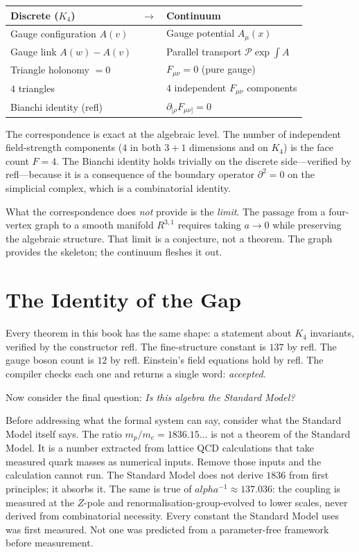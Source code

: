 \documentclass[11pt,a4paper]{book}
\def\alpha{alpha}%
\def\mathbb#1{#1}%
\def\texttt#1{#1}%
\begin{document}
\begin{center}
\begin{tabular}{lcl}
\toprule
Discrete ($K_4$) & $\longrightarrow$ & Continuum \\
\midrule
Gauge configuration $A(v)$ & & Gauge potential $A_\mu(x)$ \\
Gauge link $A(w) - A(v)$ & & Parallel transport $\mathcal{P}\exp\!\int A$ \\
Triangle holonomy $= 0$ & & $F_{\mu\nu} = 0$ (pure gauge) \\
$4$ triangles & & $4$ independent $F_{\mu\nu}$ components \\
Bianchi identity (\texttt{refl}) & & $\partial_{[\rho} F_{\mu\nu]} = 0$ \\
\bottomrule
\end{tabular}
\end{center}

The correspondence is exact at the algebraic level. The number of independent field-strength components ($4$ in both $3+1$ dimensions and on $K_4$) is the face count $F = 4$. The Bianchi identity holds trivially on the discrete side---verified by \texttt{refl}---because it is a consequence of the boundary operator $\partial^2 = 0$ on the simplicial complex, which is a combinatorial identity.

What the correspondence does \emph{not} provide is the \emph{limit}. The passage from a four-vertex graph to a smooth manifold $\mathbb{R}^{3,1}$ requires taking $a \to 0$ while preserving the algebraic structure. That limit is a conjecture, not a theorem. The graph provides the skeleton; the continuum fleshes it out.

\section{The Identity of the Gap}
\label{sec:identity-of-the-gap}

Every theorem in this book has the same shape: a statement about $K_4$ invariants, verified by the constructor \texttt{refl}. The fine-structure constant is $137$ by \texttt{refl}. The gauge boson count is $12$ by \texttt{refl}. Einstein's field equations hold by \texttt{refl}. The compiler checks each one and returns a single word: \emph{accepted}.

Now consider the final question: \emph{Is this algebra the Standard Model?}

Before addressing what the formal system can say, consider what the Standard Model itself says.  The ratio $m_p / m_e = 1836.15\ldots$ is not a theorem of the Standard Model.  It is a number extracted from lattice QCD calculations that take measured quark masses as numerical inputs.  Remove those inputs and the calculation cannot run.  The Standard Model does not derive $1836$ from first principles; it absorbs it.  The same is true of $\alpha^{-1} \approx 137.036$: the coupling is measured at the $Z$-pole and renormalisation-group-evolved to lower scales, never derived from combinatorial necessity.  Every constant the Standard Model uses was first measured.  Not one was predicted from a parameter-free framework before measurement.
\end{document}
